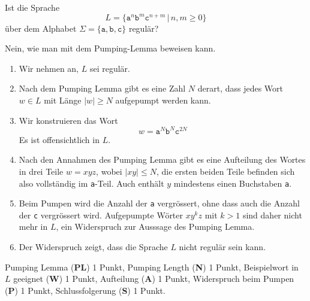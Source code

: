Ist die Sprache
\[
L=\{ \texttt{a}^n\texttt{b}^m\texttt{c}^{n+m}\,|\,n,m\ge 0\}
\]
über dem Alphabet $\Sigma= \{\texttt{a},\texttt{b},\texttt{c}\}$
regulär?

\begin{loesung}
Nein, wie man mit dem Pumping-Lemma beweisen kann.
\begin{enumerate}
\item
Wir nehmen an, $L$ sei regulär.
\item
Nach dem Pumping Lemma gibt es eine Zahl $N$ derart, dass jedes
Wort $w\in L$ mit Länge $|w|\ge N$ aufgepumpt werden kann.
\item
Wir konstruieren das Wort
\[
w=\texttt{a}^N\texttt{b}^N\texttt{c}^{2N}
\]
Es ist offensichtlich in $L$.
\item
Nach den Annahmen des Pumping Lemma gibt es eine Aufteilung des
Wortes in drei Teile $w=xyz$, wobei $|xy|\le N$, die ersten beiden
Teile befinden sich also vollständig im \texttt{a}-Teil.
Auch enthält $y$ mindestens einen Buchstaben \texttt{a}.
\item
Beim Pumpen wird die Anzahl der \texttt{a} vergrössert, ohne dass auch
die Anzahl der \texttt{c} vergrössert wird.
Aufgepumpte Wörter $xy^kz$ mit $k>1$ sind daher nicht mehr in $L$,
ein Widerspruch zur Ausssage des Pumping Lemma.
\item 
Der Widerspruch zeigt, dass die Sprache $L$ nicht regulär sein kann.
\qedhere
\end{enumerate}
\end{loesung}

\begin{bewertung}
Pumping Lemma ({\bf PL}) 1 Punkt,
Pumping Length ({\bf N}) 1 Punkt,
Beispielwort in $L$ geeignet ({\bf W}) 1 Punkt,
Aufteilung ({\bf A}) 1 Punkt,
Widerspruch beim Pumpen ({\bf P}) 1 Punkt,
Schlussfolgerung ({\bf S}) 1 Punkt.
\end{bewertung}

